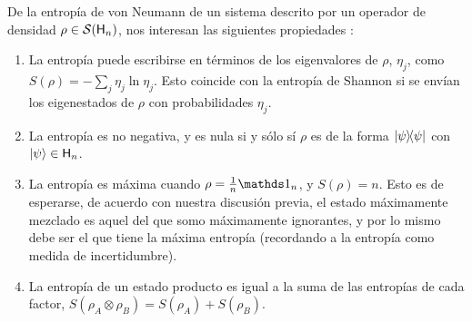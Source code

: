 
De la entropía de von Neumann de un sistema descrito por un operador de densidad $\rho\in\mathcal{S}({\sf H}_{n})$, nos interesan las siguientes propiedades \cite{Chuang}:
\begin{enumerate}
    \item La entropía puede escribirse en términos de los eigenvalores de $\rho$, $\eta_{j}$, como $S(\rho)=-\sum_{j}\eta_{j}\ln{\eta_{j}}$. Esto coincide con la entropía de Shannon si se envían los eigenestados de $\rho$ con probabilidades $\eta_{j}$.
    \item La entropía es no negativa, y es nula si y sólo sí $\rho$ es de la forma $\dyad{\psi}$ con $\ket{\psi}\in{\sf H}_{n}$.
    \item La entropía es máxima cuando $\rho=\frac{1}{n}\Id_{n}$, y $S(\rho)=n$. Esto es de esperarse, de acuerdo con nuestra discusión previa, el estado máximamente mezclado es aquel del que somo máximamente ignorantes, y por lo mismo debe ser el que tiene la máxima entropía (recordando a la entropía como medida de incertidumbre).
    \item La entropía de un estado producto es igual a la suma de las entropías de cada factor, $S(\rho_{A}\otimes\rho_{B})=S(\rho_{A})+S(\rho_{B})$. 
\end{enumerate}